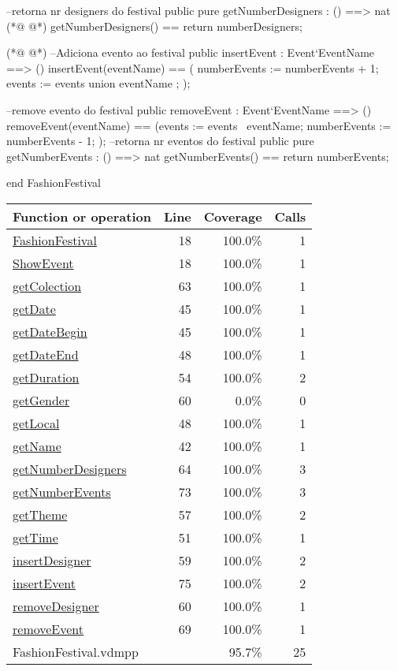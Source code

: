 \begin{vdmpp}[breaklines=true]
 --retorna nr designers do festival
  public pure getNumberDesigners : () ==> nat
(*@
\label{getNumberEvents:73}
@*)
  getNumberDesigners() == return numberDesigners;
  
(*@
\label{insertEvent:75}
@*)
  --Adiciona evento ao festival
 public insertEvent : Event`EventName ==> ()
  insertEvent(eventName) ==
  (
    numberEvents := numberEvents + 1;
    events := events union { eventName };
  );
  
   --remove evento do festival
  public removeEvent : Event`EventName ==> ()
  removeEvent(eventName) == 
  (events := events \ {eventName};
  numberEvents := numberEvents - 1;
 );
 --retorna nr eventos do festival
  public pure getNumberEvents : () ==> nat
  getNumberEvents() == return numberEvents;
  
  
end FashionFestival
\end{vdmpp}
\bigskip
\begin{longtable}{|l|r|r|r|}
\hline
Function or operation & Line & Coverage & Calls \\
\hline
\hline
\hyperref[FashionFestival:18]{FashionFestival} & 18&100.0\% & 1 \\
\hline
\hyperref[ShowEvent:18]{ShowEvent} & 18&100.0\% & 1 \\
\hline
\hyperref[getColection:63]{getColection} & 63&100.0\% & 1 \\
\hline
\hyperref[getDate:45]{getDate} & 45&100.0\% & 1 \\
\hline
\hyperref[getDateBegin:45]{getDateBegin} & 45&100.0\% & 1 \\
\hline
\hyperref[getDateEnd:48]{getDateEnd} & 48&100.0\% & 1 \\
\hline
\hyperref[getDuration:54]{getDuration} & 54&100.0\% & 2 \\
\hline
\hyperref[getGender:60]{getGender} & 60&0.0\% & 0 \\
\hline
\hyperref[getLocal:48]{getLocal} & 48&100.0\% & 1 \\
\hline
\hyperref[getName:42]{getName} & 42&100.0\% & 1 \\
\hline
\hyperref[getNumberDesigners:64]{getNumberDesigners} & 64&100.0\% & 3 \\
\hline
\hyperref[getNumberEvents:73]{getNumberEvents} & 73&100.0\% & 3 \\
\hline
\hyperref[getTheme:57]{getTheme} & 57&100.0\% & 2 \\
\hline
\hyperref[getTime:51]{getTime} & 51&100.0\% & 1 \\
\hline
\hyperref[insertDesigner:59]{insertDesigner} & 59&100.0\% & 2 \\
\hline
\hyperref[insertEvent:75]{insertEvent} & 75&100.0\% & 2 \\
\hline
\hyperref[removeDesigner:60]{removeDesigner} & 60&100.0\% & 1 \\
\hline
\hyperref[removeEvent:69]{removeEvent} & 69&100.0\% & 1 \\
\hline
\hline
FashionFestival.vdmpp & & 95.7\% & 25 \\
\hline
\end{longtable}

